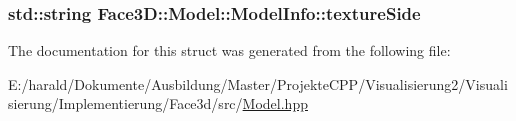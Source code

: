 \subsubsection[{\texorpdfstring{texture\+Side}{textureSide}}]{\setlength{\rightskip}{0pt plus 5cm}std\+::string Face3\+D\+::\+Model\+::\+Model\+Info\+::texture\+Side}\hypertarget{struct_face3_d_1_1_model_1_1_model_info_a0afbed21c950938c52f4a02da26cfb75}{}\label{struct_face3_d_1_1_model_1_1_model_info_a0afbed21c950938c52f4a02da26cfb75}


The documentation for this struct was generated from the following file\+:\begin{DoxyCompactItemize}
\item 
E\+:/harald/\+Dokumente/\+Ausbildung/\+Master/\+Projekte\+C\+P\+P/\+Visualisierung2/\+Visualisierung/\+Implementierung/\+Face3d/src/\hyperlink{_model_8hpp}{Model.\+hpp}\end{DoxyCompactItemize}
